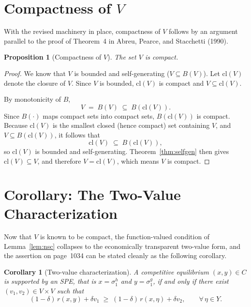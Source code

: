 \documentclass[12pt]{article}
\newtheorem{proposition}[theorem]{Proposition}
\newtheorem{corollary}[theorem]{Corollary}
\theoremstyle{definition}
\begin{document}
\section{Compactness of $V$}
\label{sec:compact}

With the revised machinery in place, compactness of $V$ follows by an argument
parallel to the proof of Theorem~4 in Abreu, Pearce, and Stacchetti (1990).

\begin{proposition}[Compactness of $V$]
\label{prop:compact}
The set $V$ is compact.
\end{proposition}

\begin{proof}
We know that $V$ is bounded and self-generating ($V \subseteq B(V)$).
Let $\mathrm{cl}(V)$ denote the closure of $V$.  Since $V$ is bounded,
$\mathrm{cl}(V)$ is compact and $V \subseteq \mathrm{cl}(V)$.

By monotonicity of $B$,
\[
V \;=\; B(V) \;\subseteq\; B(\mathrm{cl}(V)).
\]
Since $B(\cdot)$ maps compact sets into compact sets, $B(\mathrm{cl}(V))$ is
compact.  Because $\mathrm{cl}(V)$ is the smallest closed (hence compact) set
containing $V$, and $V \subseteq B(\mathrm{cl}(V))$, it follows that
\[
\mathrm{cl}(V) \;\subseteq\; B(\mathrm{cl}(V)),
\]
so $\mathrm{cl}(V)$ is bounded and self-generating.
Theorem~\ref{thm:selfgen} then gives $\mathrm{cl}(V) \subseteq V$, and
therefore $V = \mathrm{cl}(V)$, which means $V$ is compact.
\end{proof}

\section{Corollary: The Two-Value Characterization}
\label{sec:corollary}

Now that $V$ is known to be compact, the function-valued condition of
Lemma~\ref{lem:nsc} collapses to the economically transparent two-value form,
and the assertion on page~1034 can be stated cleanly as the following
corollary.

\begin{corollary}[Two-value characterization]
\label{cor:two-value}
A competitive equilibrium $(x, y) \in C$ is supported by an SPE, that is
$x = \sigma^h_1$ and $y = \sigma^g_1$, if and only if there exist
$(v_1, v_2) \in V \times V$ such that
\[
(1-\delta)\,r(x,y) + \delta v_1
\;\geq\;
(1-\delta)\,r(x,\eta) + \delta v_2,
\qquad \forall\, \eta \in Y.
\]
\end{corollary}
\end{document}
